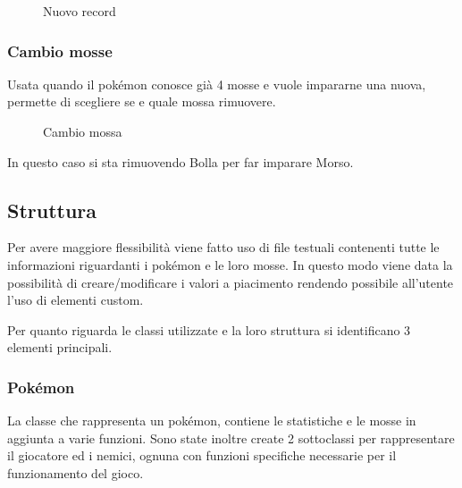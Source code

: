 \documentclass{article}
\begin{document}
        \begin{figure}[ht]
            \centering
            \caption{Nuovo record}
            \label{fig:game_over_record.png}
        \end{figure}

    \newpage

\vspace{5pt}

\subsubsection{Cambio mosse}

Usata quando il pokémon conosce già 4 mosse e vuole impararne una nuova, permette di scegliere se e quale mossa rimuovere.

\vspace{5pt}

        \begin{figure}[ht]
            \centering
            \caption{Cambio mossa}
            \label{fig:change.png}
            \vspace{5pt}
        \end{figure}

In questo caso si sta rimuovendo Bolla per far imparare Morso.

\vspace{10pt}

\subsection{Struttura}

Per avere maggiore flessibilità viene fatto uso di file testuali contenenti tutte le informazioni riguardanti i pokémon e le loro mosse. In questo modo viene data la possibilità di creare/modificare i valori a piacimento rendendo possibile all'utente l'uso di elementi custom.

Per quanto riguarda le classi utilizzate e la loro struttura si identificano 3 elementi principali.

\newpage

\subsubsection{Pokémon}

La classe che rappresenta un pokémon, contiene le statistiche e le mosse in aggiunta a varie funzioni. Sono state inoltre create 2 sottoclassi per rappresentare il giocatore ed i nemici, ognuna con funzioni specifiche necessarie per il funzionamento del gioco.
\end{document}
